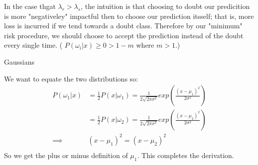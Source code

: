 \documentclass[letter]{article}
\newenvironment{menumerate}{%
  \edef\backupindent{\the\parindent}%
  \enumerate%
  \setlength{\parindent}{\backupindent}%
}{\endenumerate}
\begin{document}
\begin{menumerate}
\begin{menumerate}
    In the case thgat $\lambda_r > \lambda_s$, the intuition is that choosing to
    doubt our predicition is more "negativeley" impactful then to choose our prediction
    itsself; that is, more loss is incurred if we tend towards a doubt class.
    Therefore by our "minimum" risk procedure, we should choose to accept the prediction
    instead of the doubt every single time. ( $P(\omega_i|x) \geq 0 > 1 - m $ where $m > 1$.)
  \end{menumerate}
  \newpage
  \item Gaussians
  \begin{menumerate}
    \item We want to equate the two distributions so:
    \begin{equation}
      \begin{aligned}
               P(\omega_1 | x) &= \frac12 P(x | \omega_1) = \frac{1}{2\sqrt{2\pi\sigma^2}}exp\left(\frac{(x-\mu_1)^2}{2\sigma^2}\right) \\
                &= \frac12 P(x | \omega_2) = \frac{1}{2\sqrt{2\pi\sigma^2}}exp\left(\frac{(x-\mu_2)^2}{2\sigma^2}\right) \\
                \implies  &(x-\mu_1)^2 = (x-\mu_2)^2 \\
      \end{aligned}
     \end{equation} 
     So we get the plus or minus definition of $\mu_1.$ This completes the derivation.
  \end{menumerate}
\end{menumerate}
\end{document}
